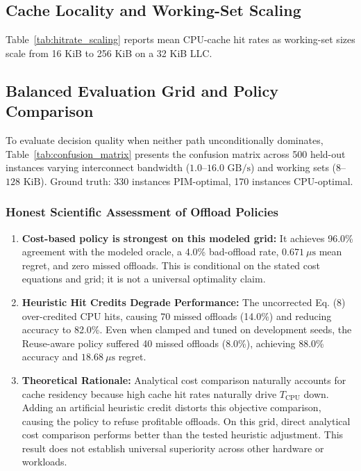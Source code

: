 \documentclass[journal,10pt,twocolumn]{IEEEtran}
\begin{document}
\subsection{Cache Locality and Working-Set Scaling}
Table~\ref{tab:hitrate_scaling} reports mean CPU-cache hit rates as working-set sizes scale from 16 KiB to 256 KiB on a 32 KiB LLC.

\subsection{Balanced Evaluation Grid and Policy Comparison}
To evaluate decision quality when neither path unconditionally dominates, Table~\ref{tab:confusion_matrix} presents the confusion matrix across 500 held-out instances varying interconnect bandwidth ($1.0$--$16.0\text{ GB/s}$) and working sets ($8$--$128\text{ KiB}$). Ground truth: 330 instances PIM-optimal, 170 instances CPU-optimal.

\subsubsection{Honest Scientific Assessment of Offload Policies}
\begin{enumerate}
    \item \textbf{Cost-based policy is strongest on this modeled grid:} It achieves 96.0\% agreement with the modeled oracle, a 4.0\% bad-offload rate, $0.671\ \mu\text{s}$ mean regret, and zero missed offloads. This is conditional on the stated cost equations and grid; it is not a universal optimality claim.
    \item \textbf{Heuristic Hit Credits Degrade Performance:} The uncorrected Eq. (8) over-credited CPU hits, causing 70 missed offloads (14.0\%) and reducing accuracy to 82.0\%. Even when clamped and tuned on development seeds, the Reuse-aware policy suffered 40 missed offloads (8.0\%), achieving 88.0\% accuracy and $18.68\ \mu\text{s}$ regret.
    \item \textbf{Theoretical Rationale:} Analytical cost comparison naturally accounts for cache residency because high cache hit rates naturally drive $T_{\text{CPU}}$ down. Adding an artificial heuristic credit distorts this objective comparison, causing the policy to refuse profitable offloads. On this grid, direct analytical cost comparison performs better than the tested heuristic adjustment. This result does not establish universal superiority across other hardware or workloads.
\end{enumerate}
\end{document}
